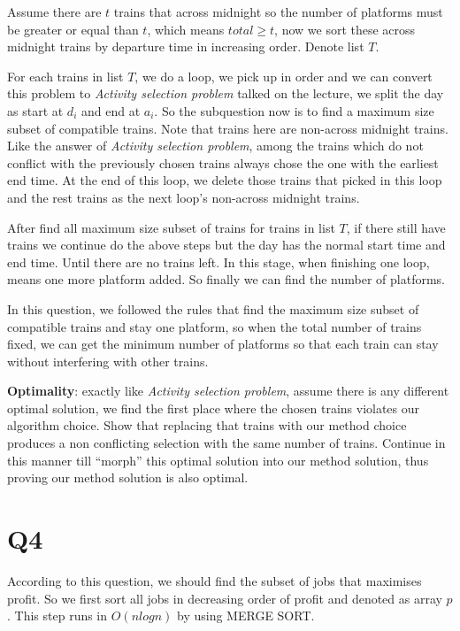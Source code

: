 \documentclass[a4paper]{article}
\begin{document}
	Assume there are $t$ trains that across midnight so the number of platforms must be greater or equal than $t$, which means $total \geq t$, now we sort these across midnight trains by departure time in increasing order. Denote list $T$.
	
	For each trains in list $T$, we do a loop, we pick up in order and we can convert this problem to \textit{Activity selection problem} talked on the lecture, we split the day as start at $d_i$ and end at $a_i$. So the subquestion now is to find a maximum size subset of compatible trains. Note that trains here are non-across midnight trains. Like the answer of \textit{Activity selection problem}, among the trains which do not conflict with the previously chosen trains always chose the one with the earliest end time. At the end of this loop, we delete those trains that picked in this loop and the rest trains as the next loop's non-across midnight trains.
	
	After find all maximum size subset of trains for trains in list $T$, if there still have trains we continue do the above steps but the day has the normal start time and end time. Until there are no trains left. In this stage, when finishing one loop, means one more platform added. So finally we can find the number of platforms.
	
	In this question, we followed the rules that find the maximum size subset of compatible trains and stay one platform, so when the total number of trains fixed, we can get the minimum number of platforms so that each train can stay without interfering with other trains.
	  
	\textbf{Optimality}: exactly like \textit{Activity selection problem}, assume there is any different optimal solution, we find the first place where the chosen trains violates our algorithm choice. Show that replacing that trains with our method choice produces a non conflicting selection with the same number of trains. Continue in this manner till  “morph” this optimal solution into our method solution, thus proving our method solution is also optimal.
	
	\section*{Q4}
	According to this question, we should find the subset of jobs that maximises profit. So we first sort all jobs in decreasing order of profit and denoted as array $p$. This step runs in $O(nlog n)$ by using MERGE SORT.
	
\end{document}
